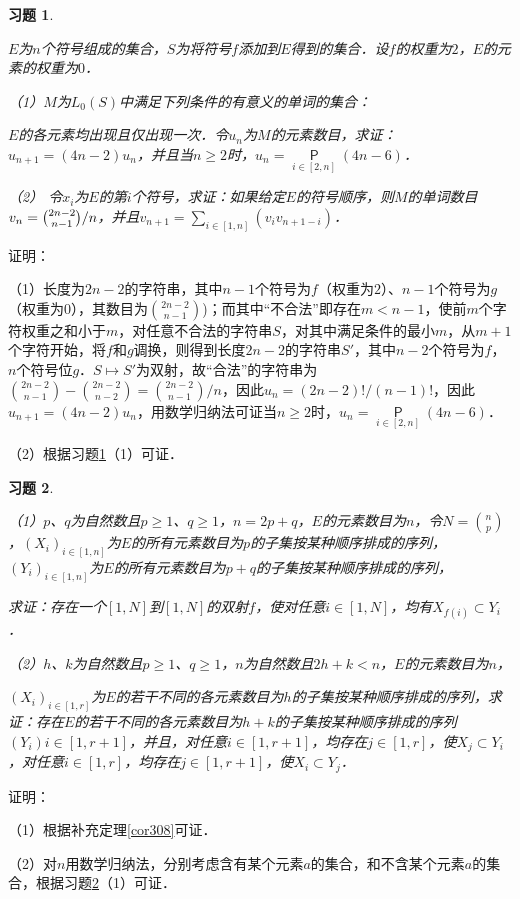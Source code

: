 \documentclass[12pt, a4paper, oneside]{book}
\newtheorem{exer}{习题}
\begin{document}
			\begin{exer}\label{exer148}
				\hfill\par
				$E$为$n$个符号组成的集合，$S$为将符号$f$添加到$E$得到的集合．设$f$的权重为$2$，$E$的元素的权重为$0$．
				\par
				（1）$M$为$L_0(S)$中满足下列条件的有意义的单词的集合：
				\par
				$E$的各元素均出现且仅出现一次．令$u_n$为$M$的元素数目，求证：$u_{n+1}=(4n-2)u_n$，并且当$n\geq 2$时，$u_n=\mathop{\mathsf{P}}\limits_{i\in [2, n]}(4n-6)$．
				\par
				（2）	令$x_i$为$E$的第$i$个符号，求证：如果给定$E$的符号顺序，则$M$的单词数目$v_n=\\\binom{2n-2}{n-1}/n$，并且$v_{n+1}=\sum\limits_{i\in [1, n]}(v_iv_{n+1-i})$．
			\end{exer}
			证明：
			\par
			（1）长度为$2n-2$的字符串，其中$n-1$个符号为$f$（权重为$2$）、$n-1$个符号为$g$（权重为$0$），其数目为$\binom{2n-2}{n-1}$)；而其中“不合法”即存在$m<n-1$，使前$m$个字符权重之和小于$m$，对任意不合法的字符串$S$，对其中满足条件的最小$m$，从$m+1$个字符开始，将$f$和$g$调换，则得到长度$2n-2$的字符串$S'$，其中$n-2$个符号为$f$，$n$个符号位$g$．$S\mapsto S'$为双射，故“合法”的字符串为$\binom{2n-2}{n-1}-\binom{2n-2}{n-2}=\binom{2n-2}{n-1}/n$，因此$u_n=(2n-2)!/(n-1)!$，因此$u_{n+1}=(4n-2)u_n$，用数学归纳法可证当$n\geq 2$时，$u_n=\mathop{\mathsf{P}}\limits_{i\in [2, n]}(4n-6)$．
			\par
			（2）根据习题\ref{exer148}（1）可证．
			
			\begin{exer}\label{exer149}
				\hfill\par
				（1）$p$、$q$为自然数且$p\geq 1$、$q\geq 1$，$n=2p+q$，$E$的元素数目为$n$，令$N=\binom{n}{p}$，$(X_i)_{i\in [1, n]}$为$E$的所有元素数目为$p$的子集按某种顺序排成的序列，$(Y_i)_{i\in [1, n]}$为$E$的所有元素数目为$p+q$的子集按某种顺序排成的序列，
				\par
				求证：存在一个$[1, N]$到$[1, N]$的双射$f$，使对任意$i\in [1, N]$，均有$X_{f(i)}\subset Y_i$．
				\par
				（2）$h$、$k$为自然数且$p\geq 1$、$q\geq 1$，$n$为自然数且$2h+k<n$，$E$的元素数目为$n$，
				\par
				$(X_i)_{i\in [1, r]}$为$E$的若干不同的各元素数目为$h$的子集按某种顺序排成的序列，求证：存在$E$的若干不同的各元素数目为$h+k$的子集按某种顺序排成的序列$(Y_i)i\in [1, r+1]$，并且，对任意$i\in [1, r+1]$，均存在$j\in [1, r]$，使$X_j\subset Y_i$，对任意$i\in [1, r]$，均存在$j\in [1, r+1]$，使$X_i\subset Y_j$．
			\end{exer}
			证明：
			\par
			（1）根据补充定理\ref{cor308}可证．
			\par
			（2）对$n$用数学归纳法，分别考虑含有某个元素$a$的集合，和不含某个元素$a$的集合，根据习题\ref{exer149}（1）可证．
						
\end{document}
